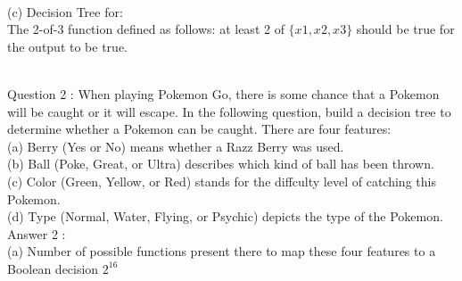 \documentclass{article}
\begin{document}
\\[10pt]
(c) Decision Tree for: 
\\The 2-of-3 function defined as follows: at least 2 of ${\{x1, x2, x3\}}$ should be true for the output to be true.
\\[10pt]
\\[10pt]
Question 2 : When playing Pokemon Go, there is some chance that a Pokemon will be caught or it will escape. In the following question, build a decision tree to determine whether a Pokemon can be caught. There are four features:
\\(a) Berry (Yes or No) means whether a Razz Berry was used.
\\(b) Ball (Poke, Great, or Ultra) describes which kind of ball has been thrown.
\\(c) Color (Green, Yellow, or Red) stands for the diffculty level of catching this Pokemon.
\\(d) Type (Normal, Water, Flying, or Psychic) depicts the type of the Pokemon.
\\[10pt]
Answer 2 :
\\[10pt]
(a) Number of possible functions present there to map these four features to a Boolean decision $2^{16}$
\end{document}
